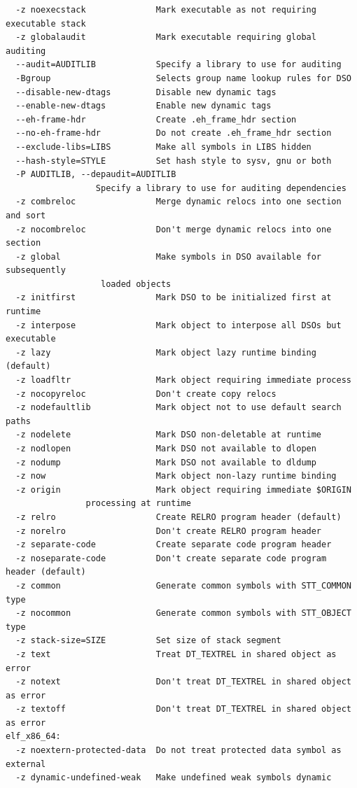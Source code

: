 \documentclass{article}
\begin{document}
\begin{lstlisting}
  -z noexecstack              Mark executable as not requiring executable stack
  -z globalaudit              Mark executable requiring global auditing
  --audit=AUDITLIB            Specify a library to use for auditing
  -Bgroup                     Selects group name lookup rules for DSO
  --disable-new-dtags         Disable new dynamic tags
  --enable-new-dtags          Enable new dynamic tags
  --eh-frame-hdr              Create .eh_frame_hdr section
  --no-eh-frame-hdr           Do not create .eh_frame_hdr section
  --exclude-libs=LIBS         Make all symbols in LIBS hidden
  --hash-style=STYLE          Set hash style to sysv, gnu or both
  -P AUDITLIB, --depaudit=AUDITLIB
			      Specify a library to use for auditing dependencies
  -z combreloc                Merge dynamic relocs into one section and sort
  -z nocombreloc              Don't merge dynamic relocs into one section
  -z global                   Make symbols in DSO available for subsequently
			       loaded objects
  -z initfirst                Mark DSO to be initialized first at runtime
  -z interpose                Mark object to interpose all DSOs but executable
  -z lazy                     Mark object lazy runtime binding (default)
  -z loadfltr                 Mark object requiring immediate process
  -z nocopyreloc              Don't create copy relocs
  -z nodefaultlib             Mark object not to use default search paths
  -z nodelete                 Mark DSO non-deletable at runtime
  -z nodlopen                 Mark DSO not available to dlopen
  -z nodump                   Mark DSO not available to dldump
  -z now                      Mark object non-lazy runtime binding
  -z origin                   Mark object requiring immediate $ORIGIN
				processing at runtime
  -z relro                    Create RELRO program header (default)
  -z norelro                  Don't create RELRO program header
  -z separate-code            Create separate code program header
  -z noseparate-code          Don't create separate code program header (default)
  -z common                   Generate common symbols with STT_COMMON type
  -z nocommon                 Generate common symbols with STT_OBJECT type
  -z stack-size=SIZE          Set size of stack segment
  -z text                     Treat DT_TEXTREL in shared object as error
  -z notext                   Don't treat DT_TEXTREL in shared object as error
  -z textoff                  Don't treat DT_TEXTREL in shared object as error
elf_x86_64:
  -z noextern-protected-data  Do not treat protected data symbol as external
  -z dynamic-undefined-weak   Make undefined weak symbols dynamic

\end{lstlisting}
\end{document}

